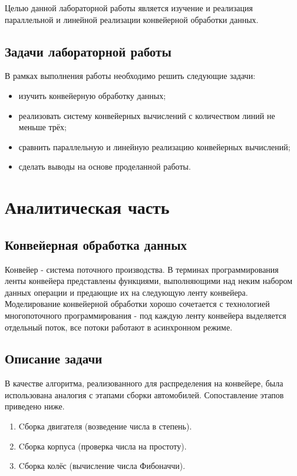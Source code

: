 \documentclass[12pt]{report}
\begin{document}
Целью данной лабораторной работы является изучение и реализация параллельной и линейной реализации конвейерной обработки данных.

\section*{Задачи лабораторной работы}

В рамках выполнения работы необходимо решить следующие задачи:

\begin{itemize}
	\item изучить конвейерную обработку данных;
	\item реализовать систему конвейерных вычислений с количеством линий не меньше трёх;
	\item сравнить параллельную и линейную реализацию конвейерных вычислений;
	\item сделать выводы на основе проделанной работы.
\end{itemize}

\chapter{Аналитическая часть}

\section{Конвейерная обработка данных}

Конвейер - система поточного производства. В терминах программирования ленты конвейера представлены функциями, выполняющими над неким набором данных операции и предающие их на следующую ленту конвейера. Моделирование конвейерной обработки хорошо сочетается с технологией многопоточного программирования - под каждую ленту конвейера выделяется отдельный поток, все потоки работают в асинхронном режиме.

\section{Описание задачи}

В качестве алгоритма, реализованного для распределения на конвейере, была использована аналогия с этапами сборки автомобилей. Сопоставление этапов приведено ниже. 

\begin{enumerate}
	\item Cборка двигателя (возведение числа в степень).
	\item Cборка корпуса (проверка числа на простоту).
	\item Cборка колёс (вычисление числа Фибоначчи).
\end{enumerate}
\end{document}
